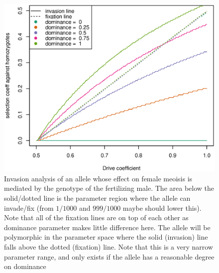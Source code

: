 \documentclass[12pt,letterpaper]{article}
\newcommand{\gc}[1]{{ \color{red} #1}}
\begin{document}
\begin{figure}
\includegraphics[width = 0.8 \textwidth]{Figures/effect_of_dominance_on_invasion_space_one_graph.eps} 
\caption{Invasion analysis of an allele whose effect
 on female meoisis is mediated by the genotype of the fertilizing
 male. The area below the solid/dotted line is the parameter region
 where the allele can invade/fix (from $1/1000$ and $999/1000$
 \gc{maybe should lower this}). Note
 that all of the fixation lines are on top of each other as dominance
 parameter makes little difference here. The allele will be
 polymorphic in the parameter space where the solid (invasion) line
 falls above the dotted (fixation) line. Note that this is a very
 narrow parameter range, and only exists if the allele has a
 reasonable degree on dominance}  \label{Effect_of_dominance}
\end{figure}
\end{document}
